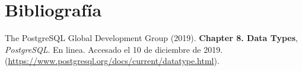 \documentclass{article}
\begin{document}
       
       \newpage
           {\noindent \section*{Bibliografía}}
           
           {\noindent
             [1] The PostgreSQL Global Development Group (2019). {\bfseries Chapter 8. Data Types},
             {\itshape PostgreSQL}.
             En linea. Accesado el 10 de diciembre de 2019.
             (\url{https://www.postgresql.org/docs/current/datatype.html}).
             \par \vspace{0.3cm}
           }\\
           
\end{document}
